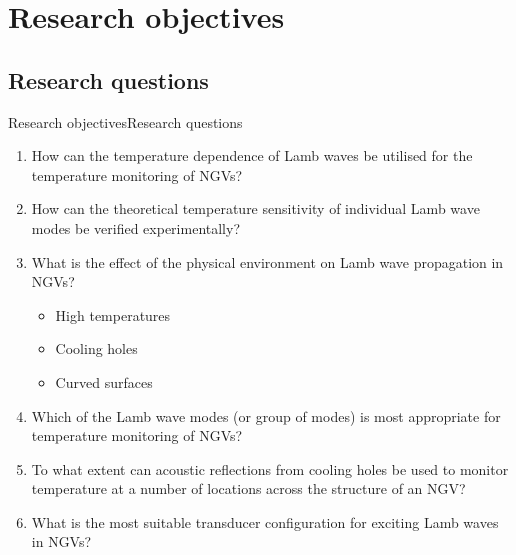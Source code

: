 \documentclass[aspectratio=169, 9pt]{beamer}
\begin{document}

\section{Research objectives}
\subsection{Research questions}
\begin{frame}{Research objectives}{Research questions}

  \begin{enumerate}
      \item How can the temperature dependence of Lamb waves be utilised for the temperature monitoring of NGVs?\label{itm:1}
      \item How can the theoretical temperature sensitivity of individual Lamb wave modes be verified experimentally?\label{itm:2}
      \item What is the effect of the physical environment on Lamb wave propagation in NGVs?\label{itm:3}
  \begin{itemize}
      \item High temperatures
      \item Cooling holes
      \item Curved surfaces
  \end{itemize}
      \item Which of the Lamb wave modes (or group of modes) is most appropriate for temperature monitoring of NGVs?\label{itm:4}
      \item To what extent can acoustic reflections from cooling holes be used to monitor temperature at a number of locations across the structure of an NGV?\label{itm:5}
      \item What is the most suitable transducer configuration for exciting Lamb waves in NGVs?\label{itm:6}
  \end{enumerate}
\end{frame}

\end{document}
